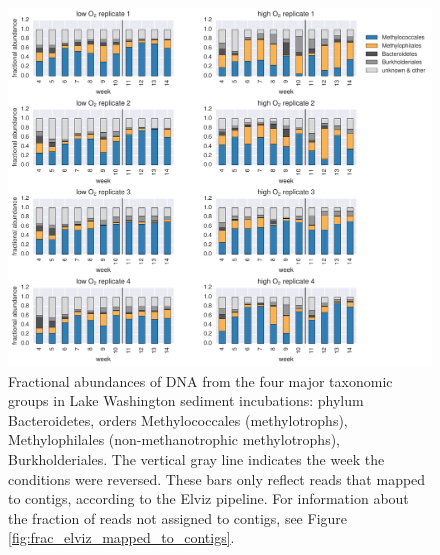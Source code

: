 \begin{figure}[H]
\centering
    \includegraphics[width=1.0\textwidth]{./tex/chapter2/figures/170413_4_main_groups.pdf}  %
    \begin{singlespace}
    \caption[Four major taxonomic groups in Lake Washington sediment incubations]{
        Fractional abundances of DNA from the four major taxonomic groups in Lake Washington sediment incubations:
	    phylum Bacteroidetes, orders Methylococcales (methylotrophs), Methylophilales (non-methanotrophic methylotrophs), Burkholderiales.
        The vertical gray line indicates the week the  conditions were reversed.
        These bars only reflect reads that mapped to contigs, according to the Elviz pipeline.
        For information about the fraction of reads not assigned to contigs, see Figure \ref{fig:frac_elviz_mapped_to_contigs}.
        }
    \label{fig:4dominant_groups}
    \end{singlespace}
\end{figure}

